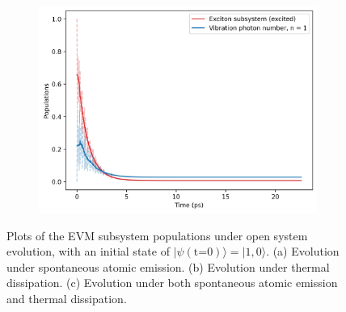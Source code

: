 \documentclass[11pt]{article}
\begin{document}
\begin{figure}[H]
    \vspace{0.5cm}
    
    \begin{subfigure}{0.45\textwidth}
        \centering
        \includegraphics[width=\linewidth]{Research Project/Code/results/ExVib/Open/Population/pops_ex_both_e0.png}
        \caption{}
        \label{fig:EVM_OQS_Pop_both}
    \end{subfigure}
    \hfill

    \caption{Plots of the EVM subsystem populations under open system evolution, with an initial state of $|\psi (\text{t=0})\rangle = |1, 0\rangle$. (a) Evolution under spontaneous atomic emission. (b) Evolution under thermal dissipation. (c) Evolution under both spontaneous atomic emission and thermal dissipation.}
    \label{fig:EVM_OQS_Pop}
\end{figure}
\end{document}
